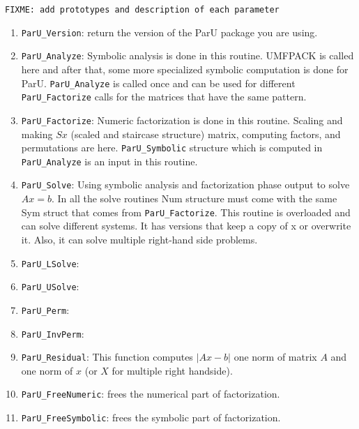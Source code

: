 \documentclass[12pt]{article}
\begin{document}
\verb'FIXME: add prototypes and description of each parameter' %

\begin{enumerate}

    \item \verb'ParU_Version': return the version of the ParU package 
        you are using.

    \item \verb'ParU_Analyze': Symbolic analysis is done in this routine. 
        UMFPACK is called here and after that, some more specialized symbolic
        computation is done for ParU. 
        \verb'ParU_Analyze' is called once and can be used for different 
        \verb'ParU_Factorize' calls for the matrices that have the same pattern.
    \item \verb'ParU_Factorize': 
        Numeric factorization is done in this routine. Scaling and
        making $Sx$ (scaled and staircase structure) matrix, computing factors,
        and permutations are here. \verb'ParU_Symbolic' structure which is 
        computed in \verb'ParU_Analyze' is an input in this routine.

    \item \verb'ParU_Solve':  
        Using symbolic analysis and factorization phase output to solve $Ax=b$.
        In all the solve routines Num structure must come with the same 
        Sym struct that comes from \verb'ParU_Factorize'. 
        This routine is overloaded and can solve different systems. It has 
        versions that keep a copy of x or overwrite it. Also, it can solve 
        multiple right-hand side problems.

    \item \verb'ParU_LSolve':       %
    \item \verb'ParU_USolve':       %
    \item \verb'ParU_Perm':         %
    \item \verb'ParU_InvPerm':      %

    \item \verb'ParU_Residual':  
        This function computes $|Ax-b|$ one norm of matrix $A$ and one norm of
        $x$ (or $X$ for multiple right handside).

    \item \verb'ParU_FreeNumeric':  frees the numerical part of factorization.

    \item \verb'ParU_FreeSymbolic':  frees the symbolic part of factorization.

\end{enumerate}
\end{document}

